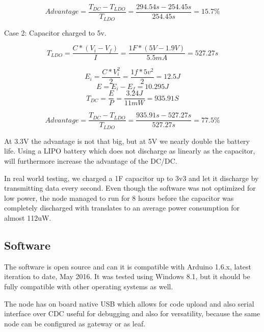 $$Advantage = \frac{T_{DC} - T_{LDO}}{T_{LDO}} = \frac{294.54s - 254.45s}{254.45s} = 15.7\%$$

Case 2: Capacitor charged to 5v.

$$T_{LDO} = \frac{C * (V_i - V_f)}{I}=\frac{1F * (5V - 1.9V)}{5.5mA} = 527.27s $$

$$E_i = \frac{C*V_i^2}{2} = \frac{1f*5v^2}{2} =12.5J$$
$$E = E_i - E_f = 10.295J$$
$$T_{DC} = \frac{E}{P} = \frac{3.24J}{11mW} =935.91S $$

$$Advantage = \frac{T_{DC} - T_{LDO}}{T_{LDO}} = \frac{935.91s - 527.27s}{527.27s} = 77.5\%$$

At 3.3V the advantage is not that big, but at 5V we nearly double the battery life. Using a LIPO
battery which does not discharge as linearly as the capacitor, will furthermore increase the
advantage of the DC/DC.

In real world testing, we charged a 1F capacitor up to 3v3 and let it discharge by transmitting data every second. Even though the software was not
optimized for low power, the node managed to run for 8 hours before the capacitor was completely
discharged with translates to an average power consumption for almost 112uW.


\subsection{Software}

The software is open source and can it is compatible with Arduino 1.6.x, latest iteration to date,
May 2016. It was tested using Windows 8.1, but it should be fully compatible with other operating systems as well.

The node has on board native USB which allows for code upload and also serial interface over CDC
useful for debugging and also for versatility, because the same node can be configured as gateway or
as leaf.
